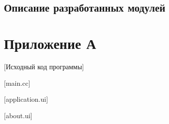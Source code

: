 \documentclass[variant=courcework]{bsuir}
\begin{document}
\section{Описание разработанных модулей}





\chapter*{Приложение А}[Исходный код программы]

[main.cc]

[application.ui]

[about.ui]
\end{document}
